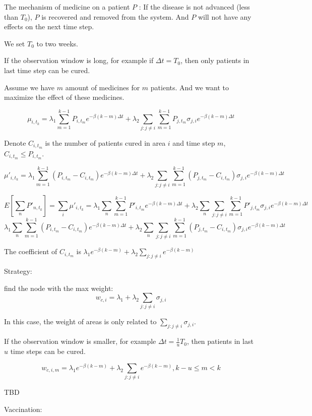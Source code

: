 \documentclass[12pt]{article}
\begin{document}
The mechanism of medicine on a patient $P$ : If the disease is not advanced (less than $T_0$), $P$ is recovered and removed from the system. And $P$ will not have any effects on the next time step.

We set $T_0$ to two weeks. 

If the observation window is long, for example if $\Delta t= T_0$, then only patients in last time step can be cured.

Assume we have $m$ amount of medicines for $m$ patients. And we want to maximize the effect of these medicines.

$$\mu_{i,t_k} = \lambda_1 \sum_{m = 1}^{ k-1} P_{i,t_m} e^{-\beta(k-m)\Delta t} + \lambda_2 \sum_{j:j\neq i} \sum_{m = 1}^{ k-1} P_{j,t_m} \sigma_{j,i} e^{-\beta(k-m)\Delta t}$$

Denote $C_{i,t_m}$ is the number of patients cured in area $i$ and time step $m$, $C_{i,t_m} \leq P_{i,t_m}$.

$$\mu'_{i,t_k} = \lambda_1 \sum_{m = 1}^{ k-1} (P_{i,t_m} - C_{i,t_m}) e^{-\beta(k-m)\Delta t} + \lambda_2 \sum_{j:j\neq i} \sum_{m = 1}^{ k-1} (P_{j,t_m}-C_{i,t_m}) \sigma_{j,i} e^{-\beta(k-m)\Delta t}$$

$$
E[\sum_n {P'_{n,t_k}}] = \sum_i \mu'_{i,t_k} = \lambda_1 \sum_n \sum_{m = 1}^{ k-1} P'_{i,t_m} e^{-\beta(k-m)\Delta t} + \lambda_2 \sum_n \sum_{j:j\neq i} \sum_{m = 1}^{ k-1} P'_{j,t_m} \sigma_{j,i} e^{-\beta(k-m)\Delta t}
$$
$$
\lambda_1 \sum_n \sum_{m = 1}^{ k-1} (P_{i,t_m} - C_{i,t_m}) e^{-\beta(k-m)\Delta t} + \lambda_2 \sum_n \sum_{j:j\neq i} \sum_{m = 1}^{ k-1} (P_{j,t_m} - C_{i,t_m}) \sigma_{j,i} e^{-\beta(k-m)\Delta t}
$$

The coefficient of $C_{i,t_m}$ is $\lambda_1 e^{-\beta(k-m)} + \lambda_2 \sum_{j:j\neq i} e^{-\beta(k-m) }$

Strategy: 

find the node with the max weight:
 $$w_{c,i} = \lambda_1 + \lambda_2 \sum_{j:j\neq i} \sigma_{j,i}$$
 
In this case, the weight of areas is only related to $\sum_{j:j\neq i} \sigma_{j,i}$.


If the observation window is smaller, for example $\Delta t = \frac{1}{u} T_0$, then patients in last $u$ time steps can be cured. 

$$w_{c,i,m} = \lambda_1 e^{-\beta(k-m)} + \lambda_2 \sum_{j:j\neq i} e^{-\beta(k-m) }, k-u\leq m < k$$


TBD


Vaccination:
\end{document}
